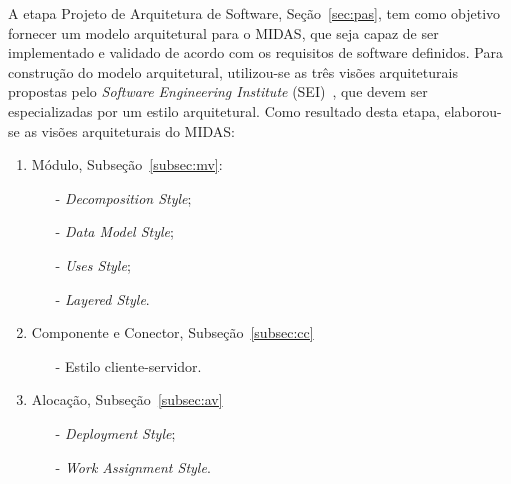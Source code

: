 \documentclass[11pt,a4paper]{article}
\begin{document}

A etapa Projeto de Arquitetura de Software, Seção~\ref{sec:pas}, tem como objetivo fornecer um modelo arquitetural para o MIDAS, que seja capaz de ser implementado e validado de acordo com os requisitos de software definidos. Para construção do modelo arquitetural, utilizou-se as três visões arquiteturais propostas pelo \textit{Software Engineering Institute} (SEI)~\cite{clements2002documenting}, que devem ser especializadas por um estilo arquitetural. Como resultado desta etapa, elaborou-se as visões arquiteturais do MIDAS:

\begin{multicols}{2}
\begin{enumerate}
\item Módulo, Subseção~\ref{subsec:mv}:
	\begin{itemize}
	\item[-] \textit{Decomposition Style}; 
    \item[-] \textit{Data Model Style};
    \item[-] \textit{Uses Style};
    \item[-] \textit{Layered Style}.
	\end{itemize}
\item Componente e Conector, Subseção~\ref{subsec:cc}
	\begin{itemize}
	\item[-] Estilo cliente-servidor.
	\end{itemize}
\item Alocação, Subseção~\ref{subsec:av}
	\begin{itemize}
	\item[-] \textit{Deployment Style}; 
    \item[-] \textit{Work Assignment Style}.
	\end{itemize}
\end{enumerate}

\end{multicols}

\end{document}
